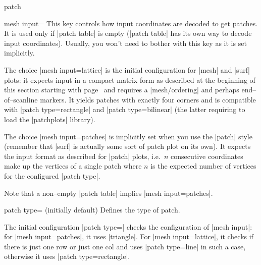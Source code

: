 {\begin{plottype}[/pgfplots]{patch}
\begin{pgfplotskey}{mesh input=}
	This key controls how input coordinates are decoded to get patches. It is used only if |patch table| is empty (|patch table| has its own way to decode input coordinates). Usually, you won't need to bother with this key as it is set implicitly.

	The choice |mesh input=lattice| is the initial configuration for |mesh| and |surf| plots: it expects input in a compact matrix form as described at the beginning of this section starting with page~\pageref{sec:3d} and requires a |mesh/ordering| and perhaps end--of--scanline markers. It yields patches with exactly four corners and is compatible with |patch type=rectangle| and |patch type=bilinear| (the latter requiring to load the |patchplots| library).

	The choice |mesh input=patches| is implicitly set when you use the |patch| style (remember that |surf| is actually some sort of patch plot on its own). It expects the input format as described for |patch| plots, i.e.\ $n$ consecutive coordinates make up the vertices of a single patch where $n$ is the expected number of vertices for the configured |patch type|. 

	Note that a non--empty |patch table| implies |mesh input=patches|.
\end{pgfplotskey}

\begin{pgfplotskey}{patch type= (initially default)}
\label{key:patch:type}
	Defines the type of patch. 

	The initial configuration |patch type=| checks the configuration of |mesh input|: for |mesh input=patches|, it uses |triangle|. For |mesh input=lattice|, it checks if there is just one row or just one col and uses |patch type=line| in such a case, otherwise it uses |patch type=rectangle|.


\end{pgfplotskey}
\end{plottype}}
